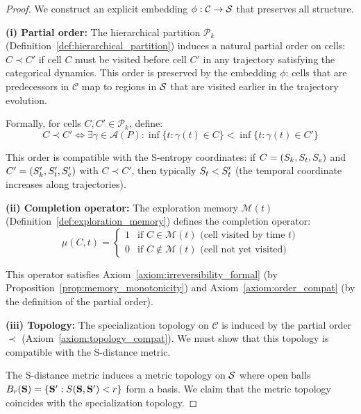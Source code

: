 \begin{proof}
We construct an explicit embedding $\phi: \mathcal{C} \to \mathcal{S}$ that preserves all structure.

\textbf{(i) Partial order:} The hierarchical partition $\mathcal{P}_k$ (Definition~\ref{def:hierarchical_partition}) induces a natural partial order on cells: $C \prec C'$ if cell $C$ must be visited before cell $C'$ in any trajectory satisfying the categorical dynamics. This order is preserved by the embedding $\phi$: cells that are predecessors in $\mathcal{C}$ map to regions in $\mathcal{S}$ that are visited earlier in the trajectory evolution.

Formally, for cells $C, C' \in \mathcal{P}_k$, define:
\begin{equation}
C \prec C' \iff \exists \gamma \in \mathcal{A}(P) : \inf\{t : \gamma(t) \in C\} < \inf\{t : \gamma(t) \in C'\}
\end{equation}

This order is compatible with the S-entropy coordinates: if $C = (S_k, S_t, S_e)$ and $C' = (S_k', S_t', S_e')$ with $C \prec C'$, then typically $S_t < S_t'$ (the temporal coordinate increases along trajectories).

\textbf{(ii) Completion operator:} The exploration memory $\mathcal{M}(t)$ (Definition~\ref{def:exploration_memory}) defines the completion operator:
\begin{equation}
\mu(C, t) = \begin{cases}
1 & \text{if } C \in \mathcal{M}(t) \text{ (cell visited by time } t\text{)} \\
0 & \text{if } C \notin \mathcal{M}(t) \text{ (cell not yet visited)}
\end{cases}
\end{equation}

This operator satisfies Axiom~\ref{axiom:irreversibility_formal} (by Proposition~\ref{prop:memory_monotonicity}) and Axiom~\ref{axiom:order_compat} (by the definition of the partial order).

\textbf{(iii) Topology:} The specialization topology on $\mathcal{C}$ is induced by the partial order $\prec$ (Axiom~\ref{axiom:topology_compat}). We must show that this topology is compatible with the S-distance metric.

The S-distance metric induces a metric topology on $\mathcal{S}$ where open balls $B_r(\mathbf{S}) = \{\mathbf{S}' : S(\mathbf{S}, \mathbf{S}') < r\}$ form a basis. We claim that the metric topology coincides with the specialization topology.


\end{proof}
